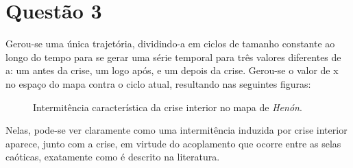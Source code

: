 \documentclass{article}[twocolumn]
\begin{document}
	\section{Quest\~ao 3}
	Gerou-se uma \'unica trajet\'oria, dividindo-a em ciclos de tamanho constante ao longo
	do tempo para se gerar uma s\'erie temporal para tr\^es valores diferentes de a: um
	antes da crise, um logo ap\'os, e um depois da crise. Gerou-se o valor de x no espa\c{c}o
	do mapa contra o ciclo atual, resultando nas seguintes figuras:
	\begin{figure}[H]
		\centering
		\caption{Intermit\^encia caracter\'istica da crise interior no mapa de \textit{Hen\'on}.}
	\end{figure}
	Nelas, pode-se ver claramente como uma intermit\^encia induzida por crise interior aparece,
	junto com a crise, em virtude do acoplamento que ocorre entre as selas ca\'oticas, exatamente
	como \'e descrito na literatura.
\end{document}
